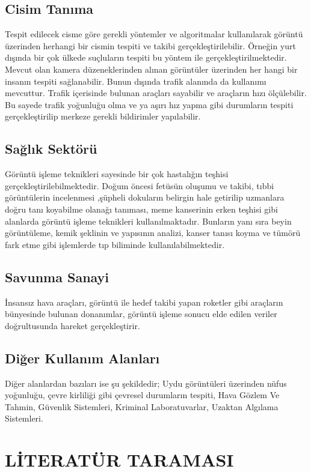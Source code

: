 \subsection{Cisim Tanıma}
Tespit edilecek cisme göre gerekli yöntemler ve algoritmalar kullanılarak görüntü üzerinden herhangi bir cismin tespiti ve takibi gerçekleştirilebilir. Örneğin yurt dışında  bir çok ülkede suçluların tespiti bu yöntem ile gerçekleştirilmektedir. Mevcut olan kamera düzeneklerinden alınan görüntüler üzerinden her hangi bir insanın tespiti sağlanabilir. Bunun dışında trafik alanında da kullanımı mevcuttur. Trafik içerisinde bulunan araçları sayabilir ve araçların hızı ölçülebilir. Bu sayede trafik yoğunluğu olma ve ya aşırı hız yapma gibi durumların tespiti gerçekleştirilip merkeze gerekli bildirimler yapılabilir.
\subsection{Sağlık Sektörü}
Görüntü işleme teknikleri sayesinde bir çok hastalığın teşhisi gerçekleştirilebilmektedir. Doğum öncesi fetüsün oluşumu ve takibi, tıbbi görüntülerin incelenmesi ,şüpheli dokuların belirgin hale getirilip uzmanlara doğru tanı koyabilme olanağı tanıması, meme kanserinin erken teşhisi gibi alanlarda görüntü işleme teknikleri kullanılmaktadır. Bunların yanı sıra beyin görüntüleme, kemik şeklinin ve yapısının analizi, kanser tanısı koyma ve tümörü fark etme gibi işlemlerde tıp biliminde kullanılabilmektedir.
\subsection{Savunma Sanayi}
İnsansız hava araçları, görüntü ile hedef takibi yapan roketler gibi araçların bünyesinde bulunan donanımlar, görüntü işleme sonucu elde edilen veriler doğrultusunda hareket gerçekleştirir.
\subsection{Diğer Kullanım Alanları}
Diğer alanlardan bazıları ise şu şekildedir;
Uydu görüntüleri üzerinden nüfus yoğunluğu, çevre kirliliği gibi çevresel durumların tespiti,
Hava Gözlem Ve Tahmin,
Güvenlik Sistemleri,
Kriminal Laboratuvarlar,
Uzaktan Algılama Sistemleri.\\
\newpage

\section{LİTERATÜR TARAMASI}

